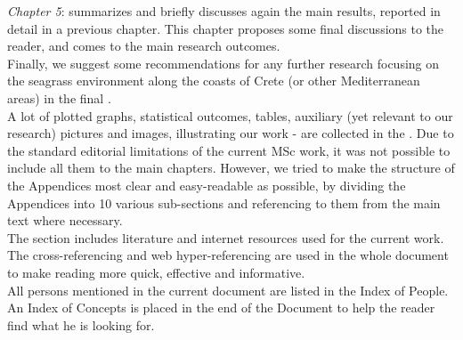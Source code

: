 \documentclass[11pt]{article}
\begin{document}
\textit{Chapter 5}:  summarizes and briefly discusses again the main results, reported in detail in a previous chapter. This chapter proposes some final discussions to the reader, and comes to the main research outcomes.\\
Finally, we suggest some recommendations for any further research focusing on the seagrass environment along the coasts of Crete (or other Mediterranean areas) in the final .\\
A lot of plotted graphs, statistical outcomes, tables, auxiliary (yet relevant to our research) pictures and images, illustrating our work - are collected in the . Due to the standard editorial limitations of the current MSc work, it was not possible to include all them to the main chapters. However, we tried to make the structure of the Appendices most clear and easy-readable as possible, by dividing the Appendices into 10 various sub-sections and referencing to them from the main text where necessary. \\
The  section includes literature and internet resources used for the current work. The cross-referencing and web hyper-referencing are used in the whole document to make reading more quick, effective and informative.\\
All persons mentioned in the current document are listed in the Index of People. \\
An Index of Concepts is placed in the end of the Document to help the reader find what he is looking for.

\pagebreak
\end{document}
